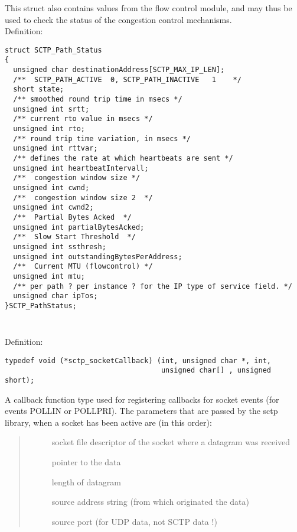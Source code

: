 \documentclass[10pt]{article}
\newcommand{\bv}{\vspace{0,1cm}\noindent \\ Definition:\footnotesize\begin{verbatim}}
\newcommand{\n}{\normalsize}
\newcommand{\no}{ }
\begin{document}
This struct also contains values from the flow control module, and
may thus be used to check the status of the congestion control
mechanisms.
\bv
struct SCTP_Path_Status
{
  unsigned char destinationAddress[SCTP_MAX_IP_LEN];
  /**  SCTP_PATH_ACTIVE  0, SCTP_PATH_INACTIVE   1    */
  short state;
  /** smoothed round trip time in msecs */
  unsigned int srtt;
  /** current rto value in msecs */
  unsigned int rto;
  /** round trip time variation, in msecs */
  unsigned int rttvar;
  /** defines the rate at which heartbeats are sent */
  unsigned int heartbeatIntervall;
  /**  congestion window size */
  unsigned int cwnd;
  /**  congestion window size 2  */
  unsigned int cwnd2;
  /**  Partial Bytes Acked  */
  unsigned int partialBytesAcked;
  /**  Slow Start Threshold  */
  unsigned int ssthresh;
  unsigned int outstandingBytesPerAddress;
  /**  Current MTU (flowcontrol) */
  unsigned int mtu;
  /** per path ? per instance ? for the IP type of service field. */
  unsigned char ipTos;
}SCTP_PathStatus;
\end{verbatim} \n


\subsubsection{}
\bv
typedef void (*sctp_socketCallback) (int, unsigned char *, int,
                                     unsigned char[] , unsigned short);

\end{verbatim}
\n
A callback function type used for registering callbacks for 
socket events (for events POLLIN or POLLPRI).
The parameters that are passed by the sctp library, when a socket has been
active are (in this order): 
\begin{quote} \begin{description} \no
\item[] socket file descriptor of the socket where a datagram was received
\item[] pointer to the data
\item[] length of datagram
\item[] source address string (from which originated the data)
\item[] source port (for UDP data, not SCTP data !)
\end{description} \end{quote}
\end{document}
